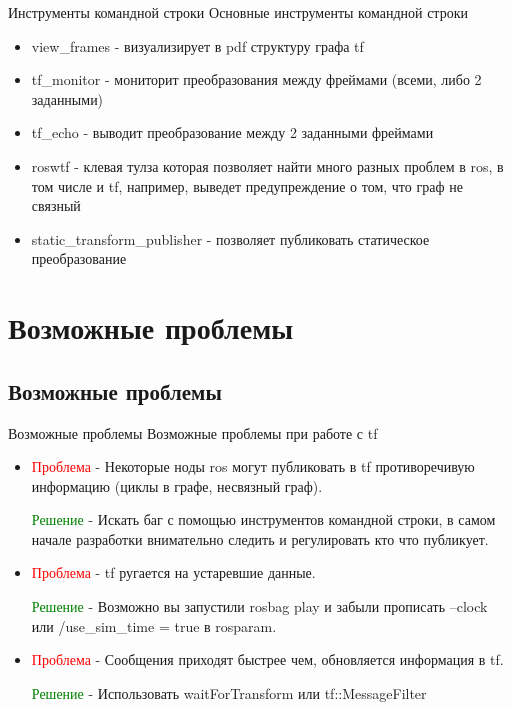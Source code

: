 \documentclass[9pt]{beamer}
\begin{document}
\begin{frame}{Инструменты командной строки}
Основные инструменты командной строки 
  \begin{itemize}
    \item
    {
      view\_frames - визуализирует в pdf структуру графа tf
    }
    \item
    {
      tf\_monitor - мониторит преобразования между фреймами (всеми, либо 2 заданными) 
    }
    \item
    {
      tf\_echo - выводит преобразование между 2 заданными фреймами
    }
    \item
    {
      roswtf - клевая тулза которая позволяет найти много разных проблем в ros, в том числе и tf, например, выведет предупреждение о том, что граф не связный
    }
    \item
    {
      static\_transform\_publisher - позволяет публиковать статическое преобразование
    }
  \end{itemize}
\end{frame}

\section{Возможные проблемы}
\subsection{Возможные проблемы}

\begin{frame}{Возможные проблемы}
Возможные проблемы при работе с tf
  \begin{itemize}
    \item
    {
      \textcolor{red}{Проблема} - Некоторые ноды ros могут публиковать в tf противоречивую информацию (циклы в графе, несвязный граф).

      \textcolor{green}{Решение} - Искать баг с помощью инструментов командной строки, в самом начале разработки внимательно следить и регулировать кто что публикует.
    }
    \item
    {
      \textcolor{red}{Проблема} - tf ругается на устаревшие данные.

      \textcolor{green}{Решение} - Возможно вы запустили rosbag play и забыли прописать --clock или /use\_sim\_time = true в rosparam.
    }
    \item
    {
      \textcolor{red}{Проблема} - Сообщения приходят быстрее чем, обновляется информация в tf. 

      \textcolor{green}{Решение} - Использовать waitForTransform или tf::MessageFilter
    }
  \end{itemize}
\end{frame}
\end{document}
